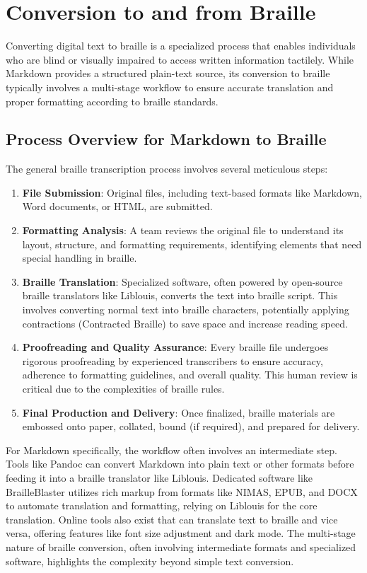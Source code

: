 \section{Conversion to and from Braille}
\label{sec:markdown-braille}

Converting digital text to braille is a specialized process that enables individuals who are blind or visually impaired to access written information tactilely. While Markdown provides a structured plain-text source, its conversion to braille typically involves a multi-stage workflow to ensure accurate translation and proper formatting according to braille standards.

\subsection{Process Overview for Markdown to Braille}
The general braille transcription process involves several meticulous steps:
\begin{enumerate}
    \item \textbf{File Submission}: Original files, including text-based formats like Markdown, Word documents, or HTML, are submitted.\cite{BrailleProcess}
    \item \textbf{Formatting Analysis}: A team reviews the original file to understand its layout, structure, and formatting requirements, identifying elements that need special handling in braille.\cite{BrailleProcess}
    \item \textbf{Braille Translation}: Specialized software, often powered by open-source braille translators like Liblouis, converts the text into braille script.\cite{Liblouis}\cite{DAISYPipeline}\cite{BrailleBlaster} This involves converting normal text into braille characters, potentially applying contractions (Contracted Braille) to save space and increase reading speed.\cite{InclusiveASL}\cite{TextToBraille}
    \item \textbf{Proofreading and Quality Assurance}: Every braille file undergoes rigorous proofreading by experienced transcribers to ensure accuracy, adherence to formatting guidelines, and overall quality.\cite{BrailleProcess} This human review is critical due to the complexities of braille rules.
    \item \textbf{Final Production and Delivery}: Once finalized, braille materials are embossed onto paper, collated, bound (if required), and prepared for delivery.\cite{BrailleProcess}\cite{YouTubeBraille}
\end{enumerate}
For Markdown specifically, the workflow often involves an intermediate step. Tools like Pandoc can convert Markdown into plain text or other formats before feeding it into a braille translator like Liblouis.\cite{Liblouis} Dedicated software like BrailleBlaster utilizes rich markup from formats like NIMAS, EPUB, and DOCX to automate translation and formatting, relying on Liblouis for the core translation.\cite{BrailleBlaster} Online tools also exist that can translate text to braille and vice versa, offering features like font size adjustment and dark mode.\cite{BrailleTranslatorGH} The multi-stage nature of braille conversion, often involving intermediate formats and specialized software, highlights the complexity beyond simple text conversion.

